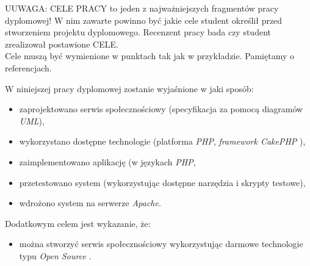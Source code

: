 UUWAGA:
CELE PRACY to jeden z najważniejszych fragmentów pracy dyplomowej! W nim zawarte powinno być jakie cele student określił przed stworzeniem projektu dyplomowego. Recenzent pracy bada czy student zrealizował postawione CELE.
\\
Cele muszą być wymienione w punktach tak jak w przykładzie. Pamiętamy o referencjach.

W niniejszej pracy dyplomowej zostanie wyjaśnione w jaki sposób:
\begin{itemize}
\item zaprojektowano serwis społecznościowy (specyfikacja za pomocą diagramów \emph{UML}),
\item wykorzystano dostępne technologie (platforma \emph{PHP}, \emph{framework CakePHP} \cite[s.\pageref{sec:referencje}]{django}),
\item zaimplementowano aplikację (w językach \emph{PHP},
\item przetestowano system (wykorzystując dostępne narzędzia i skrypty testowe),
\item wdrożono system na serwerze \emph{Apache}\cite[s.\pageref{sec:referencje}]{apache}.
\end{itemize}
Dodatkowym celem jest wykazanie, że:
\begin{itemize}
\item można stworzyć serwis społecznościowy wykorzystując darmowe technologie typu \emph{Open Source} \cite[s.\pageref{sec:referencje}]{opensource}.
\end{itemize}